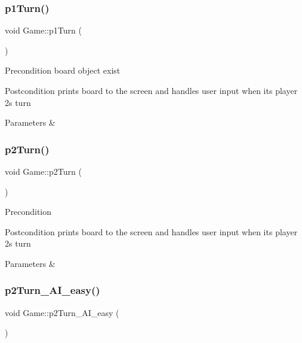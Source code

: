 \subsubsection{\texorpdfstring{p1\+Turn()}{p1Turn()}}
{\footnotesize\ttfamily void Game\+::p1\+Turn (\begin{DoxyParamCaption}{ }\end{DoxyParamCaption})}

\begin{DoxyPrecond}{Precondition}
board object exist 
\end{DoxyPrecond}
\begin{DoxyPostcond}{Postcondition}
prints board to the screen and handles user input when its player 2\textquotesingle{}s turn 
\end{DoxyPostcond}

\begin{DoxyParams}{Parameters}
{\em } & \\
\hline
\end{DoxyParams}
\mbox{\label{classGame_a7e6bed36a3792fe78e94395de3924a2b}} 
\subsubsection{\texorpdfstring{p2\+Turn()}{p2Turn()}}
{\footnotesize\ttfamily void Game\+::p2\+Turn (\begin{DoxyParamCaption}{ }\end{DoxyParamCaption})}

\begin{DoxyPrecond}{Precondition}

\end{DoxyPrecond}
\begin{DoxyPostcond}{Postcondition}
prints board to the screen and handles user input when its player 2\textquotesingle{}s turn 
\end{DoxyPostcond}

\begin{DoxyParams}{Parameters}
{\em } & \\
\hline
\end{DoxyParams}
\mbox{\label{classGame_ac4dac5ed617040076d0c1afbf3383857}} 
\subsubsection{\texorpdfstring{p2\+Turn\+\_\+\+A\+I\+\_\+easy()}{p2Turn\_AI\_easy()}}
{\footnotesize\ttfamily void Game\+::p2\+Turn\+\_\+\+A\+I\+\_\+easy (\begin{DoxyParamCaption}{ }\end{DoxyParamCaption})}

